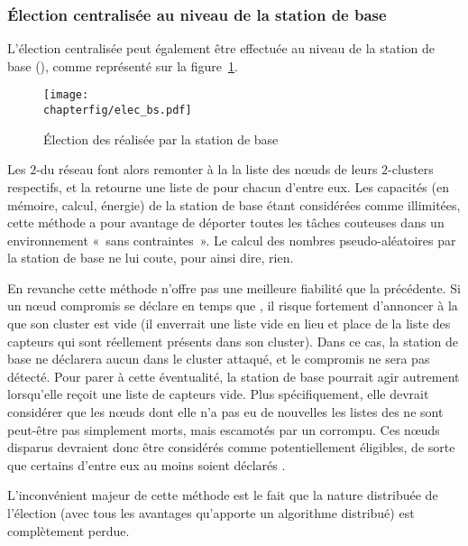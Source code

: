         \subsubsection{Élection centralisée au niveau de la station de base}
L'élection centralisée peut également être effectuée au niveau de la station de base (\BS), comme représenté sur la figure~\ref{sa:fig:elecbs}.
\begin{figure}[ht]
    \centering
    \texttt{[image: \\chapterfig/elec\_bs.pdf]}
    \caption{Élection des \cns réalisée par la station de base}\label{sa:fig:elecbs}
\end{figure}
Les $2$-\CH du réseau font alors remonter à la \BS la liste des nœuds de leurs $2$-clusters respectifs, et la \BS retourne une liste de \cns pour chacun d'entre eux.
Les capacités (en mémoire, calcul, énergie) de la station de base étant considérées comme illimitées, cette méthode a pour avantage de déporter toutes les tâches couteuses dans un environnement «~sans contraintes~».
Le calcul des nombres pseudo-aléatoires par la station de base ne lui coute, pour ainsi dire, rien.

En revanche cette méthode n'offre pas une meilleure fiabilité que la précédente.
Si un nœud compromis se déclare en temps que \CH, il risque fortement d'annoncer à la \BS que son cluster est vide (il enverrait une liste vide en lieu et place de la liste des capteurs qui sont réellement présents dans son cluster).
Dans ce cas, la station de base ne déclarera aucun \cn dans le cluster attaqué, et le \CH compromis ne sera pas détecté.
Pour parer à cette éventualité, la station de base pourrait agir autrement lorsqu'elle reçoit une liste de capteurs vide.
Plus spécifiquement, elle devrait considérer que les nœuds dont elle n'a pas eu de nouvelles \via les listes des \CH ne sont peut-être pas simplement morts, mais escamotés par un \ch corrompu.
Ces nœuds disparus devraient donc être considérés comme potentiellement éligibles, de sorte que certains d'entre eux au moins soient déclarés \cns.

L'inconvénient majeur de cette méthode est le fait que la nature distribuée de l'élection (avec tous les avantages qu'apporte un algorithme distribué) est complètement
perdue.

